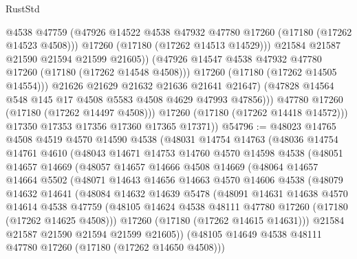 \begin{lexlean}{RustStd}
\begin{coremodule}
{\begin{coremodule}
{{{{{{{{{{{{{{{{{{{{{{{{{{{{{{{{{{{{{{{{{{{{{{{{{{{{{{{                          @4538
                          @47759
                          (@47926 @14522 @4538 @47932 @47780 @17260 (@17180 (@17262 @14523 @4508)))
                          @17260
                          (@17180 (@17262 @14513 @14529)))
                        @21584
                        @21587
                        @21590
                        @21594
                        @21599
                        @21605))
                    (@47926 @14547 @4538 @47932 @47780 @17260 (@17180 (@17262 @14548 @4508)))
                    @17260
                    (@17180 (@17262 @14505 @14554)))
                  @21626
                  @21629
                  @21632
                  @21636
                  @21641
                  @21647)
                (@47828 @14564 @548 @145 @17 @4508 @5583 @4508 @4629 @47993 @47856)))
            @47780
            @17260
            (@17180 (@17262 @14497 @4508)))
          @17260
          (@17180 (@17262 @14418 @14572)))
        @17350
        @17353
        @17356
        @17360
        @17365
        @17371))
@54796 := @48023
    @14765
    @4508
    @4519
    @4570
    @14590
    @4538
    (@48031
      @14754
      @14763
      (@48036
        @14754
        @14761
        @4610
        (@48043
          @14671
          @14753
          @14760
          @4570
          @14598
          @4538
          (@48051
            @14657
            @14669
            (@48057
              @14657
              @14666
              @4508
              @14669
              (@48064
                @14657
                @14664
                @5502
                (@48071
                  @14643
                  @14656
                  @14663
                  @4570
                  @14606
                  @4538
                  (@48079
                    @14632
                    @14641
                    (@48084
                      @14632
                      @14639
                      @5478
                      (@48091
                        @14631
                        @14638
                        @4570
                        @14614
                        @4538
                        @47759
                        (@48105 @14624 @4538 @48111 @47780 @17260 (@17180 (@17262 @14625 @4508)))
                        @17260
                        (@17180 (@17262 @14615 @14631)))
                      @21584
                      @21587
                      @21590
                      @21594
                      @21599
                      @21605))
                  (@48105 @14649 @4538 @48111 @47780 @17260 (@17180 (@17262 @14650 @4508)))
}}}}}}}}}}}}}}}}}}}}}}}}}}}}}}}}}}}}}}}}}}}}}}}}}}}}}}}
\end{coremodule}}
\end{coremodule}
\end{lexlean}
